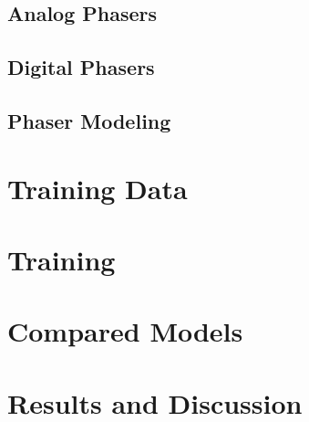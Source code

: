 \subsection{Analog Phasers}

\subsection{Digital Phasers}

\subsection{Phaser Modeling}

\section{Training Data}
\label{sec:phaser_training_data}

\section{Training}
\label{sec:phaser_training}

\section{Compared Models}
\label{sec:phaser_models}

\section{Results and Discussion}
\label{sec:phaser_results}

